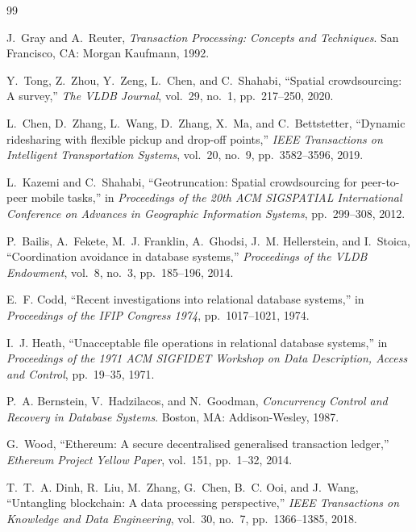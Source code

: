 \documentclass[conference]{IEEEtran}
\begin{document}
\begin{thebibliography}{99}
\footnotesize
\setlength{\itemsep}{1.0pt plus 0.5pt}
\setlength{\parskip}{0pt}

J.~Gray and A.~Reuter, \emph{Transaction Processing: Concepts and Techniques}. San Francisco, CA: Morgan Kaufmann, 1992.

Y.~Tong, Z.~Zhou, Y.~Zeng, L.~Chen, and C.~Shahabi, ``Spatial crowdsourcing: A survey,'' \emph{The VLDB Journal}, vol.~29, no.~1, pp.~217--250, 2020.

L.~Chen, D.~Zhang, L.~Wang, D.~Zhang, X.~Ma, and C.~Bettstetter, ``Dynamic ridesharing with flexible pickup and drop-off points,'' \emph{IEEE Transactions on Intelligent Transportation Systems}, vol.~20, no.~9, pp.~3582--3596, 2019.

L.~Kazemi and C.~Shahabi, ``Geotruncation: Spatial crowdsourcing for peer-to-peer mobile tasks,'' in \emph{Proceedings of the 20th ACM SIGSPATIAL International Conference on Advances in Geographic Information Systems}, pp.~299--308, 2012.

P.~Bailis, A.~Fekete, M.~J. Franklin, A.~Ghodsi, J.~M. Hellerstein, and I.~Stoica, ``Coordination avoidance in database systems,'' \emph{Proceedings of the VLDB Endowment}, vol.~8, no.~3, pp.~185--196, 2014.

E.~F. Codd, ``Recent investigations into relational database systems,'' in \emph{Proceedings of the IFIP Congress 1974}, pp.~1017--1021, 1974.

I.~J. Heath, ``Unacceptable file operations in relational database systems,'' in \emph{Proceedings of the 1971 ACM SIGFIDET Workshop on Data Description, Access and Control}, pp.~19--35, 1971.

P.~A. Bernstein, V.~Hadzilacos, and N.~Goodman, \emph{Concurrency Control and Recovery in Database Systems}. Boston, MA: Addison-Wesley, 1987.

G.~Wood, ``Ethereum: A secure decentralised generalised transaction ledger,'' \emph{Ethereum Project Yellow Paper}, vol.~151, pp.~1--32, 2014.

T.~T.~A. Dinh, R.~Liu, M.~Zhang, G.~Chen, B.~C. Ooi, and J.~Wang, ``Untangling blockchain: A data processing perspective,'' \emph{IEEE Transactions on Knowledge and Data Engineering}, vol.~30, no.~7, pp.~1366--1385, 2018.


\end{thebibliography}
\end{document}
